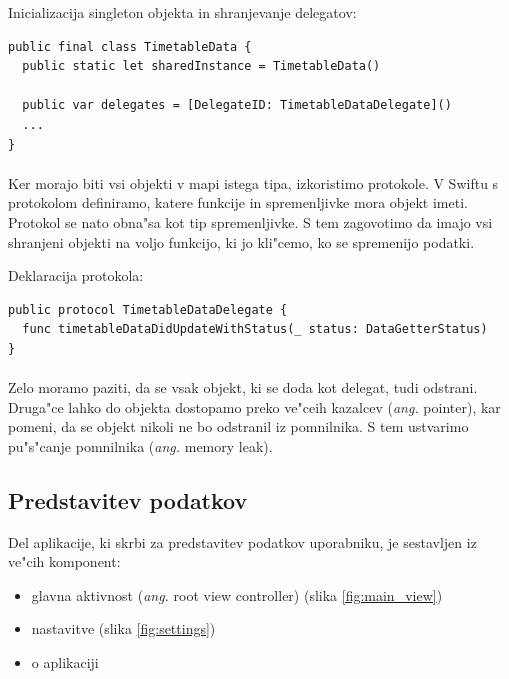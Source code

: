 \begin{center}
	Inicializacija singleton objekta in shranjevanje delegatov:
\end{center}
\begin{verbatim}
public final class TimetableData {
  public static let sharedInstance = TimetableData()
	
  public var delegates = [DelegateID: TimetableDataDelegate]()
  ...
}
\end{verbatim}

\paragraph{}
Ker morajo biti vsi objekti v mapi istega tipa, izkoristimo protokole. V Swiftu s protokolom definiramo, katere funkcije in spremenljivke mora objekt imeti. Protokol se nato obna"sa kot tip spremenljivke. S tem zagovotimo da imajo vsi shranjeni objekti na voljo funkcijo, ki jo kli"cemo, ko se spremenijo podatki.

\begin{center}
	Deklaracija protokola:
\end{center}
\begin{verbatim}
public protocol TimetableDataDelegate {
  func timetableDataDidUpdateWithStatus(_ status: DataGetterStatus)
}
\end{verbatim}

\paragraph{}
Zelo moramo paziti, da se vsak objekt, ki se doda kot delegat, tudi odstrani. Druga"ce lahko do objekta dostopamo preko ve"ceih kazalcev (\textit{ang.} pointer), kar pomeni, da se objekt nikoli ne bo odstranil iz pomnilnika. S tem ustvarimo pu"s"canje pomnilnika (\textit{ang.} memory leak).

\subsection{Predstavitev podatkov}
Del aplikacije, ki skrbi za predstavitev podatkov uporabniku, je sestavljen iz ve"cih komponent:
\begin{itemize}
	\setlength\itemsep{0em}
	\item glavna aktivnost (\textit{ang.} root view controller) (slika \ref{fig:main_view})
	\item nastavitve (slika \ref{fig:settings})
	\item o aplikaciji
\end{itemize}

